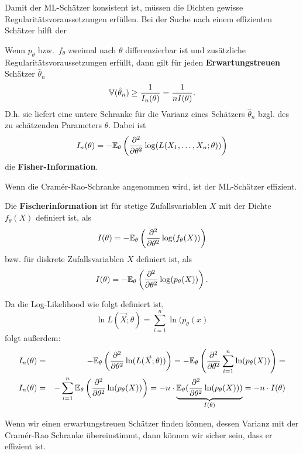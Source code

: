 
Damit der ML-Schätzer konsistent ist, müssen die Dichten gewisse Regularitätsvoraussetzungen erfüllen.
Bei der Suche nach einem effizienten Schätzer hilft der
\begin{satz}\label{satz:cramer_rao}
Wenn $p_\theta$ bzw.\ $f_\theta$ zweimal nach $\theta$ differenzierbar ist
und zusätzliche Regularitätsvoraussetzungen erfüllt, dann gilt für
jeden \textbf{Erwartungstreuen} Schätzer $\hat\theta_n$
\[\mathbb V(\hat\theta_n)\ge {1\over I_n(\theta)}={1\over nI(\theta)}.\]
D.h. sie liefert eine untere Schranke für die Varianz eines Schätzers $\hat\theta_n$ bzgl. des zu schätzenden Parameters $\theta$.
Dabei ist
\[I_n(\theta)=-\mathbb E_\theta\left({\partial^2\over\partial\theta^2}\log
(L(X_1,\dots,X_n;\theta))\right)\]
die \textbf{Fisher-Information}.

Wenn die Cramér-Rao-Schranke angenommen wird, ist der ML-Schätzer effizient.
\end{satz}

\begin{definition}Die \textbf{Fischerinformation} ist für stetige Zufallsvariablen $X$ mit der Dichte $f_\theta(X)$ definiert ist, als
\[I(\theta)=-\mathbb E_\theta\left({\partial^2\over\partial\theta^2}\log
(f_\theta(X))\right)\]
bzw. für diskrete Zufallsvariablen $X$ definiert ist, als
\[I(\theta)=-\mathbb E_\theta\left({\partial^2\over\partial\theta^2}\log
(p_\theta(X))\right).\]
\end{definition}
Da die Log-Likelihood wie folgt definiert ist, 
\[\ln L(\vec X;\theta)=\sum_{i=1}^n \ln(p_\theta(x)\]
folgt außerdem:
\begin{eqnarray*}
I_n(\theta) &=& -\mathbb E_\theta\left({\partial^2\over\partial\theta^2}\ln
(L(\vec X;\theta))\right) = -\mathbb E_\theta\left({\partial^2\over\partial\theta^2}\sum_{i=1}^n \ln(p_\theta(X))\right)= \\
I_n(\theta) &=& -\sum_{i=1}^n \mathbb E_\theta\left({\partial^2\over\partial\theta^2}\ln(p_\theta(X))\right) = -n\cdot\underbrace{\mathbb E_\theta({\partial^2\over\partial\theta^2}\ln(p_\theta(X)))}_{I(\theta)}=-n\cdot I(\theta)
\end{eqnarray*}

Wenn wir einen erwartungstreuen 
Schätzer finden können, dessen Varianz mit der
Cram\'er-Rao Schranke übereinstimmt, dann können wir sicher sein, dass
er effizient ist. 

